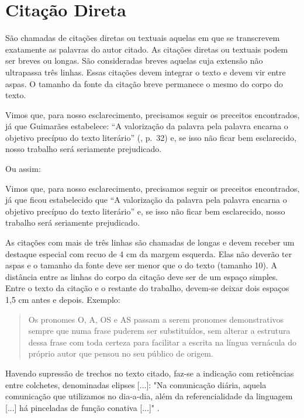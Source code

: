 \documentclass[ppgc,diss]{iiufrgs}
\begin{document}
\section{Citação Direta}
São chamadas de citações diretas ou textuais aquelas em que se transcrevem
exatamente as palavras do autor citado. As citações diretas ou textuais podem
ser breves ou longas. São consideradas breves aquelas cuja extensão não
ultrapassa três linhas. Essas citações devem integrar o texto e devem vir entre
aspas. O tamanho da fonte da citação breve permanece o mesmo do corpo do texto.

\begin{framed}
    Vimos que, para nosso esclarecimento, precisamos seguir os preceitos
    encontrados, já que Guimarães estabelece: ``A valorização da palavra pela
    palavra encarna o objetivo precípuo do texto literário''
    (\citeyear{guim1985}, p.~32) e, se isso não ficar bem esclarecido, nosso
    trabalho será seriamente prejudicado.
\end{framed}

Ou assim:

\begin{framed}
    Vimos que, para nosso esclarecimento, precisamos seguir os preceitos
    encontrados, já que ficou estabelecido que ``A valorização da palavra pela
    palavra encarna o objetivo precípuo do texto literário''
    \cite[p.~32]{guim1985} e, se isso não ficar bem esclarecido, nosso trabalho
    será seriamente prejudicado.
\end{framed}

As citações com mais de três linhas são chamadas de longas e devem receber um
destaque especial com recuo de 4 cm da margem esquerda. Elas não deverão ter
aspas e o tamanho da fonte deve ser menor que o do texto (tamanho 10). A
distância entre as linhas do corpo da citação deve ser de um espaço simples.
Entre o texto da citação e o restante do trabalho, devem-se deixar dois espaços
1,5 cm antes e depois. Exemplo:

\begin{quote}
    Os pronomes O, A, OS e AS passam a serem pronomes demonstrativos sempre que
    numa frase puderem ser substituídos, sem alterar a estrutura dessa frase
    com toda certeza para facilitar a escrita na língua vernácula do próprio
    autor que pensou no seu público de origem. \cite[p.~19]{simoes}
\end{quote}

Havendo supressão de trechos no texto citado, faz-se a indicação com
reticências entre colchetes, denominadas elipses [...]: "Na comunicação diária,
aquela comunicação que utilizamos no dia-a-dia, além da referencialidade da
linguagem [...] há pinceladas de função conativa [...]" \cite[p.~37]{chalhub}.
\end{document}
